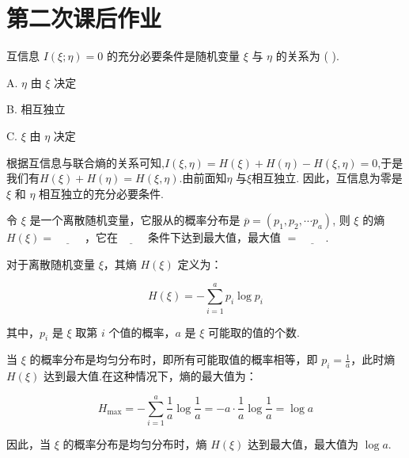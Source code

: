 \section{第二次课后作业}

\begin{tcolorbox}[breakable,colback=blue!5!white,colframe=blue!75!black,
 title= 单选题]
 互信息 $ I(\xi; \eta)=0 $ 的充分必要条件是随机变量 $ \xi $ 与 $ \eta $ 的关系为 ( ).

A. $ \eta $ 由 $ \xi $ 决定

B.  相互独立

C.  $ \xi $ 由 $ \eta $ 决定

\tcblower
根据互信息与联合熵的关系可知,$ I(\xi, \eta) =H(\xi)+H(\eta)-H(\xi,\eta)=0 $,于是我们有$ H(\xi)+H(\eta)=H(\xi,\eta) $.由前面知$ \eta $ 与$ \xi $相互独立.
因此，互信息为零是 $ \xi $ 和 $ \eta $ 相互独立的充分必要条件.

\end{tcolorbox}

\begin{tcolorbox}[breakable,colback=blue!5!white,colframe=blue!75!black,
 title= 填空题]
 令 $ \xi $ 是一个离散随机变量，它服从的概率分布是 $ \overline{p}=\left(p_{1}, p_{2}, \cdots p_{a}\right) $, 则 $ \xi $ 的熵 $ {H}(\xi)=\underline{\hspace{1cm}} $ ，它在$\underline{\hspace{1cm}}$ 条件下达到最大值，最大值 $ = \underline{\hspace{1cm}}$.

\tcblower

对于离散随机变量 $ \xi $，其熵 $ H(\xi) $ 定义为：

$$ H(\xi) = -\sum_{i=1}^{a} p_i \log p_i $$

其中，$ p_i $ 是 $ \xi $ 取第 $ i $ 个值的概率，$ a $ 是 $ \xi $ 可能取的值的个数.

当 $ \xi $ 的概率分布是均匀分布时，即所有可能取值的概率相等，即 $ p_i = \frac{1}{a} $，此时熵 $ H(\xi) $ 达到最大值.在这种情况下，熵的最大值为：

$$ H_{\text{max}} = -\sum_{i=1}^{a} \frac{1}{a} \log \frac{1}{a} = -a \cdot \frac{1}{a} \log \frac{1}{a} = \log a $$

因此，当 $ \xi $ 的概率分布是均匀分布时，熵 $ H(\xi) $ 达到最大值，最大值为 $ \log a $.

\end{tcolorbox}



